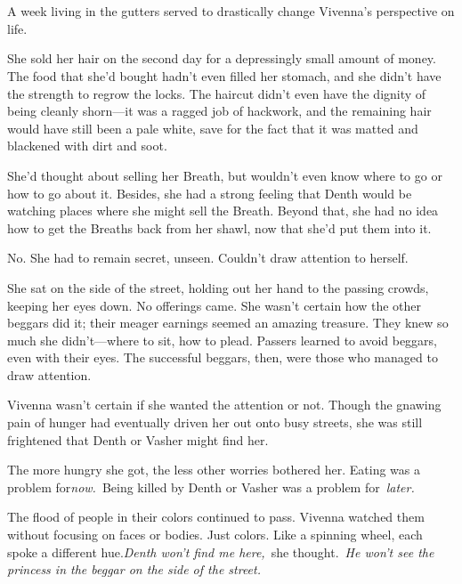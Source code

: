 \chapter{}

A week living in the gutters served to drastically change Vivenna’s perspective on life.

She sold her hair on the second day for a depressingly small amount of money. The food that she’d bought hadn’t even filled her stomach, and she didn’t have the strength to regrow the locks. The haircut didn’t even have the dignity of being cleanly shorn—it was a ragged job of hackwork, and the remaining hair would have still been a pale white, save for the fact that it was matted and blackened with dirt and soot.

She’d thought about selling her Breath, but wouldn’t even know where to go or how to go about it. Besides, she had a strong feeling that Denth would be watching places where she might sell the Breath. Beyond that, she had no idea how to get the Breaths back from her shawl, now that she’d put them into it.

No. She had to remain secret, unseen. Couldn’t draw attention to herself.

She sat on the side of the street, holding out her hand to the passing crowds, keeping her eyes down. No offerings came. She wasn’t certain how the other beggars did it; their meager earnings seemed an amazing treasure. They knew so much she didn’t—where to sit, how to plead. Passers learned to avoid beggars, even with their eyes. The successful beggars, then, were those who managed to draw attention.

Vivenna wasn’t certain if she wanted the attention or not. Though the gnawing pain of hunger had eventually driven her out onto busy streets, she was still frightened that Denth or Vasher might find her.

The more hungry she got, the less other worries bothered her. Eating was a problem for\textit{now.}~Being killed by Denth or Vasher was a problem for~\textit{later.}

The flood of people in their colors continued to pass. Vivenna watched them without focusing on faces or bodies. Just colors. Like a spinning wheel, each spoke a different hue.\textit{Denth won’t find me here,}~she thought.~\textit{He won’t see the princess in the beggar on the side of the street.}

